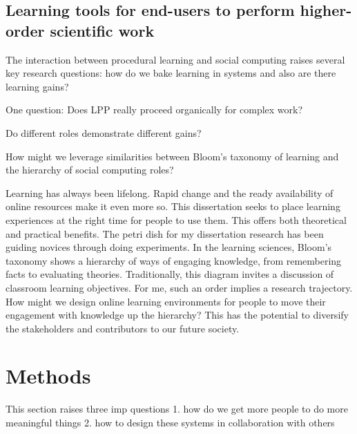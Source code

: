 \subsection{Learning tools for end-users to perform higher-order scientific work}
The interaction between procedural learning and social computing raises several key research questions: how do we bake learning in systems and also are there learning gains?

One question: Does LPP really proceed organically for complex work?

Do different roles demonstrate different gains?

How might we leverage similarities between Bloom’s taxonomy of learning and the hierarchy of social computing roles?

Learning has always been lifelong. Rapid change and the ready availability of online resources make it even more so. This dissertation seeks to place learning experiences at the right time for people to use them. This offers both theoretical and practical benefits. The petri dish for my dissertation research has been guiding novices through doing experiments. In the learning sciences, Bloom’s taxonomy shows a hierarchy of ways of engaging knowledge, from remembering facts to evaluating theories. Traditionally, this diagram invites a discussion of classroom learning objectives. For me, such an order implies a research trajectory. How might we design online learning environments for people to move their engagement with knowledge up the hierarchy? This has the potential to diversify the stakeholders and contributors to our future society. 


\section{Methods} 

This section raises three imp questions
1. how do we get more people to do more meaningful things
2. how to design these systems in collaboration with others

